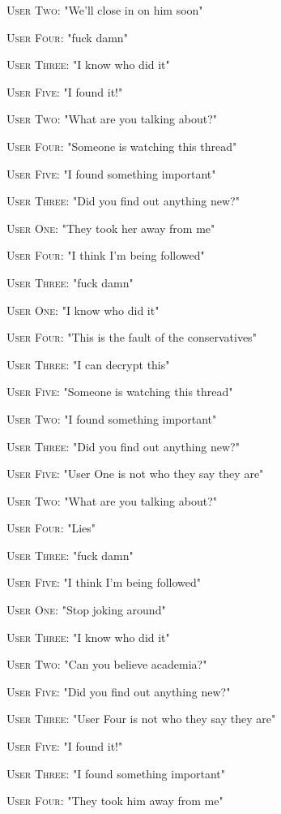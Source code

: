 \documentclass{report}
\begin{document}
\textsc{User Two}: "We'll close in on him soon" 

\textsc{User Four}: "fuck damn" 

\textsc{User Three}: "I know who did it" 

\textsc{User Five}: "I found it!" 

\textsc{User Two}: "What are you talking about?" 

\textsc{User Four}: "Someone is watching this thread" 

\textsc{User Five}: "I found something important" 

\textsc{User Three}: "Did you find out anything new?" 

\textsc{User One}: "They took her away from me" 

\textsc{User Four}: "I think I'm being followed" 

\textsc{User Three}: "fuck damn" 

\textsc{User One}: "I know who did it" 

\textsc{User Four}: "This is the fault of the conservatives" 

\textsc{User Three}: "I can decrypt this" 

\textsc{User Five}: "Someone is watching this thread" 

\textsc{User Two}: "I found something important" 

\textsc{User Three}: "Did you find out anything new?" 

\textsc{User Five}: "User One is not who they say they are" 

\textsc{User Two}: "What are you talking about?" 

\textsc{User Four}: "Lies" 

\textsc{User Three}: "fuck damn" 

\textsc{User Five}: "I think I'm being followed" 

\textsc{User One}: "Stop joking around" 

\textsc{User Three}: "I know who did it" 

\textsc{User Two}: "Can you believe academia?" 

\textsc{User Five}: "Did you find out anything new?" 

\textsc{User Three}: "User Four is not who they say they are" 

\textsc{User Five}: "I found it!" 

\textsc{User Three}: "I found something important" 

\textsc{User Four}: "They took him away from me" 
\end{document}
